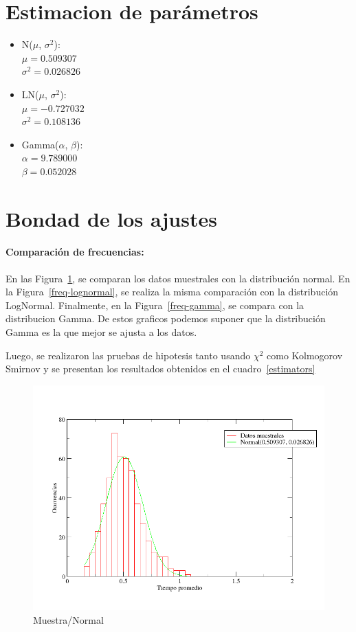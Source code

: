 \documentclass[10pt,a4paper]{article}
\begin{document}
\section{Estimacion de par\'ametros}

\begin{itemize}
  \item N($\mu$, $\sigma^{2}$): \\
    $\mu = 0.509307$ \\
    $\sigma^{2} = 0.026826$
  \item LN($\mu$, $\sigma^{2}$): \\
    $\mu = -0.727032$ \\
    $\sigma^{2} = 0.108136$
  \item Gamma($\alpha$, $\beta$): \\
    $\alpha = 9.789000$ \\
    $\beta = 0.052028$
\end{itemize}

\section{Bondad de los ajustes}

\paragraph{Comparaci\'on de frecuencias:}
En las Figura~\ref{freq-normal}, se comparan los datos muestrales con la
distribuci\'on normal. En la Figura~\ref{freq-lognormal}, se realiza la misma
comparaci\'on con la distribuci\'on LogNormal. Finalmente, en la
Figura~\ref{freq-gamma}, se compara con la distribucion Gamma. De estos
graficos podemos suponer que la distribuci\'on Gamma es la que mejor se ajusta
a los datos.

Luego, se realizaron las pruebas de hipotesis tanto usando $\chi^2$ como
Kolmogorov Smirnov y se presentan los resultados obtenidos en el
cuadro~\ref{estimators}

\begin{figure}
  \centering
  \includegraphics[scale=0.5]{freq-normal.png} 
  \caption{Muestra/Normal}
  \label{freq-normal}
\end{figure}
\end{document}
